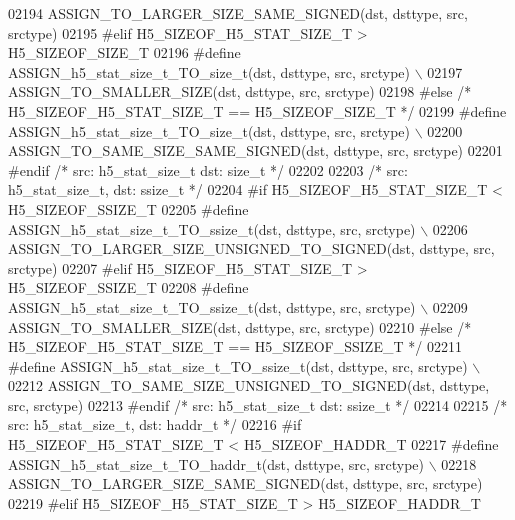 \begin{DoxyCode}
02194 \textcolor{preprocessor}{        ASSIGN\_TO\_LARGER\_SIZE\_SAME\_SIGNED(dst, dsttype, src, srctype)}
02195 \textcolor{preprocessor}{#elif H5\_SIZEOF\_H5\_STAT\_SIZE\_T > H5\_SIZEOF\_SIZE\_T}
02196 \textcolor{preprocessor}{    #define ASSIGN\_h5\_stat\_size\_t\_TO\_size\_t(dst, dsttype, src, srctype) \(\backslash\)}
02197 \textcolor{preprocessor}{        ASSIGN\_TO\_SMALLER\_SIZE(dst, dsttype, src, srctype)}
02198 \textcolor{preprocessor}{#else }\textcolor{comment}{/* H5\_SIZEOF\_H5\_STAT\_SIZE\_T == H5\_SIZEOF\_SIZE\_T */}\textcolor{preprocessor}{}
02199 \textcolor{preprocessor}{    #define ASSIGN\_h5\_stat\_size\_t\_TO\_size\_t(dst, dsttype, src, srctype) \(\backslash\)}
02200 \textcolor{preprocessor}{        ASSIGN\_TO\_SAME\_SIZE\_SAME\_SIGNED(dst, dsttype, src, srctype)}
02201 \textcolor{preprocessor}{#endif }\textcolor{comment}{/* src: h5\_stat\_size\_t dst: size\_t */}\textcolor{preprocessor}{}
02202 
02203 \textcolor{comment}{/* src: h5\_stat\_size\_t, dst: ssize\_t */}
02204 \textcolor{preprocessor}{#if H5\_SIZEOF\_H5\_STAT\_SIZE\_T < H5\_SIZEOF\_SSIZE\_T}
02205 \textcolor{preprocessor}{    #define ASSIGN\_h5\_stat\_size\_t\_TO\_ssize\_t(dst, dsttype, src, srctype) \(\backslash\)}
02206 \textcolor{preprocessor}{        ASSIGN\_TO\_LARGER\_SIZE\_UNSIGNED\_TO\_SIGNED(dst, dsttype, src, srctype)}
02207 \textcolor{preprocessor}{#elif H5\_SIZEOF\_H5\_STAT\_SIZE\_T > H5\_SIZEOF\_SSIZE\_T}
02208 \textcolor{preprocessor}{    #define ASSIGN\_h5\_stat\_size\_t\_TO\_ssize\_t(dst, dsttype, src, srctype) \(\backslash\)}
02209 \textcolor{preprocessor}{        ASSIGN\_TO\_SMALLER\_SIZE(dst, dsttype, src, srctype)}
02210 \textcolor{preprocessor}{#else }\textcolor{comment}{/* H5\_SIZEOF\_H5\_STAT\_SIZE\_T == H5\_SIZEOF\_SSIZE\_T */}\textcolor{preprocessor}{}
02211 \textcolor{preprocessor}{    #define ASSIGN\_h5\_stat\_size\_t\_TO\_ssize\_t(dst, dsttype, src, srctype) \(\backslash\)}
02212 \textcolor{preprocessor}{        ASSIGN\_TO\_SAME\_SIZE\_UNSIGNED\_TO\_SIGNED(dst, dsttype, src, srctype)}
02213 \textcolor{preprocessor}{#endif }\textcolor{comment}{/* src: h5\_stat\_size\_t dst: ssize\_t */}\textcolor{preprocessor}{}
02214 
02215 \textcolor{comment}{/* src: h5\_stat\_size\_t, dst: haddr\_t */}
02216 \textcolor{preprocessor}{#if H5\_SIZEOF\_H5\_STAT\_SIZE\_T < H5\_SIZEOF\_HADDR\_T}
02217 \textcolor{preprocessor}{    #define ASSIGN\_h5\_stat\_size\_t\_TO\_haddr\_t(dst, dsttype, src, srctype) \(\backslash\)}
02218 \textcolor{preprocessor}{        ASSIGN\_TO\_LARGER\_SIZE\_SAME\_SIGNED(dst, dsttype, src, srctype)}
02219 \textcolor{preprocessor}{#elif H5\_SIZEOF\_H5\_STAT\_SIZE\_T > H5\_SIZEOF\_HADDR\_T}

\end{DoxyCode}
